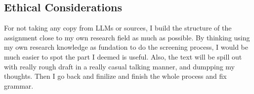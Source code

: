 \documentclass[11pt]{article}
\begin{document}
\subsection{Ethical Considerations}
For not taking any copy from LLMs or sources, I build the structure of the assignment close to my own research field as much as possible. By thinking using my own research knowledge as fundation to do the screening process, I would be much easier to spot the part I deemed is useful. Also, the text will be spill out with really rough draft in a really casual talking manner, and dumpping my thoughts. Then I go back and finilize and finish the whole process and fix grammar.




\end{document}
